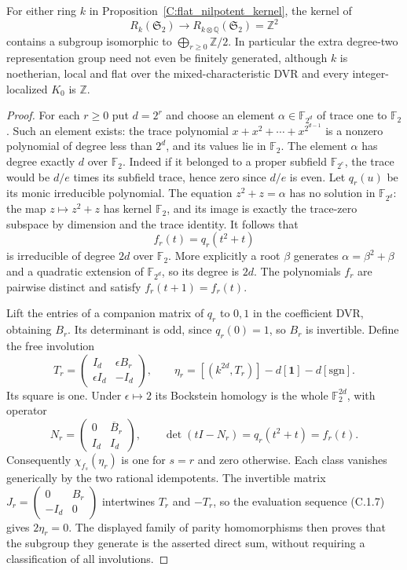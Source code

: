 \begin{corollary}
\label{C:flat_nilpotent_infinite_kernel}
For either ring $k$ in Proposition~\ref{C:flat_nilpotent_kernel}, the
kernel of
\[
 R_k(\mathfrak S_2)\longrightarrow
 R_{k\otimes\mathbb Q}(\mathfrak S_2)=\mathbb Z^2
\]
contains a subgroup isomorphic to
$\bigoplus_{r\geq0}\mathbb Z/2$.
In particular the extra degree-two representation group need not even
be finitely generated, although $k$ is noetherian, local and flat over
the mixed-characteristic DVR and every integer-localized $K_0$ is
$\mathbb Z$.
\end{corollary}
\begin{proof}
For each $r\geq0$ put $d=2^r$ and choose an element
$\alpha\in\mathbb F_{2^d}$ of trace one to $\mathbb F_2$.
Such an element exists: the trace polynomial
$x+x^2+\cdots+x^{2^{d-1}}$ is a nonzero polynomial of degree less
than $2^d$, and its values lie in $\mathbb F_2$.
The element $\alpha$ has degree exactly $d$ over $\mathbb F_2$.
Indeed if it belonged to a proper subfield $\mathbb F_{2^e}$, the
trace would be $d/e$ times its subfield trace, hence zero since $d/e$
is even. Let $q_r(u)$ be its monic irreducible polynomial.
The equation $z^2+z=\alpha$ has no solution in $\mathbb F_{2^d}$:
the map $z\mapsto z^2+z$ has kernel $\mathbb F_2$, and its image is
exactly the trace-zero subspace by dimension and the trace identity.
It follows that
\[
 f_r(t)=q_r(t^2+t)
\]
is irreducible of degree $2d$ over $\mathbb F_2$. More explicitly a
root $\beta$ generates $\alpha=\beta^2+\beta$ and a quadratic
extension of $\mathbb F_{2^d}$, so its degree is $2d$.
The polynomials $f_r$ are pairwise distinct and satisfy
$f_r(t+1)=f_r(t)$.

Lift the entries of a companion matrix of $q_r$ to $0,1$ in the
coefficient DVR, obtaining $B_r$. Its determinant is odd, since
$q_r(0)=1$, so $B_r$ is invertible. Define the free involution
\[
 T_r=\begin{pmatrix}I_d&\epsilon B_r\\
                    \epsilon I_d&-I_d\end{pmatrix},\qquad
 \eta_r=[(k^{2d},T_r)]-d[\mathbf1]-d[\mathrm{sgn}].
                                                               \tag{C.1.8}
\]
Its square is one. Under $\epsilon\mapsto2$ its Bockstein homology
is the whole $\mathbb F_2^{2d}$, with operator
\[
 N_r=\begin{pmatrix}0&\overline B_r\\I_d&I_d\end{pmatrix},
 \qquad \det(tI-N_r)=q_r(t^2+t)=f_r(t).
\]
Consequently $\chi_{f_s}(\eta_r)$ is one for $s=r$ and zero
otherwise. Each class vanishes generically by the two rational
idempotents. The invertible matrix
$J_r=\left(\begin{smallmatrix}0&B_r\\-I_d&0\end{smallmatrix}\right)$
intertwines $T_r$ and $-T_r$, so the evaluation sequence (C.1.7)
gives $2\eta_r=0$. The displayed family of parity homomorphisms
then proves that the subgroup they generate is the asserted direct
sum, without requiring a classification of all involutions.
\end{proof}

